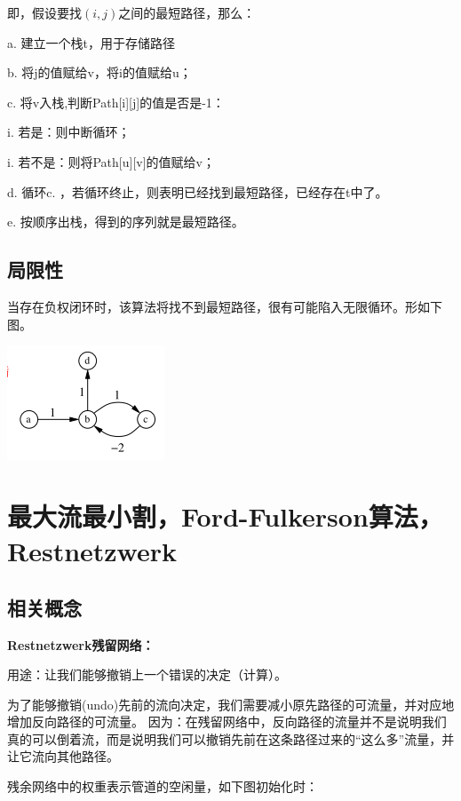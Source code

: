 \documentclass[a4paper]{article}    %
\begin{document}
\noindent 即，假设要找$(i,j)$之间的最短路径，那么：

a. 建立一个栈t，用于存储路径

b. 将j的值赋给v，将i的值赋给u；

c. 将v入栈,判断Path[i][j]的值是否是-1：

\indent\indent i. 若是：则中断循环；

\indent\indent i. 若不是：则将Path[u][v]的值赋给v；

d. 循环c. ，若循环终止，则表明已经找到最短路径，已经存在t中了。

e. 按顺序出栈，得到的序列就是最短路径。

\subsection{局限性}

当存在负权闭环时，该算法将找不到最短路径，很有可能陷入无限循环。形如下图。

\begin{center}
    \includegraphics[scale=0.6]{26.png}
\end{center}

\section{最大流最小割，Ford-Fulkerson算法，Restnetzwerk}

\subsection{相关概念}

\noindent \textbf{Restnetzwerk残留网络：}

用途：让我们能够撤销上一个错误的决定（计算）。

为了能够撤销(undo)先前的流向决定，我们需要减小原先路径的可流量，并对应地增加反向路径的可流量。
因为：在残留网络中，反向路径的流量并不是说明我们真的可以倒着流，而是说明我们可以撤销先前在这条路径过来的“这么多”流量，并让它流向其他路径。

残余网络中的权重表示管道的空闲量，如下图初始化时：
\end{document}
